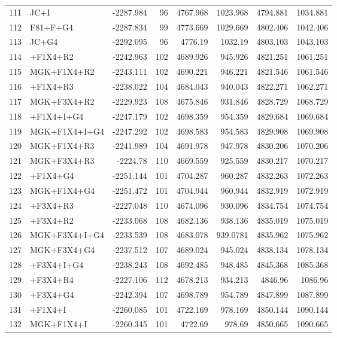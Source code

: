 \documentclass[12pt]{article}
\begin{document}
\begin{longtable}{clrrrrrr}
	111 & JC+I & -2287.984 & 96 & 4767.968 & 1023.968 & 4794.881 & 1034.881 \\ 
	112 & F81+F+G4 & -2287.834 & 99 & 4773.669 & 1029.669 & 4802.406 & 1042.406 \\ 
	113 & JC+G4 & -2292.095 & 96 & 4776.19 & 1032.19 & 4803.103 & 1043.103 \\ 
	114 & \gy+F1X4+R2 & -2242.963 & 102 & 4689.926 & 945.926 & 4821.251 & 1061.251 \\ 
	115 & MGK+F1X4+R2 & -2243.111 & 102 & 4690.221 & 946.221 & 4821.546 & 1061.546 \\ 
	116 & \gy+F1X4+R3 & -2238.022 & 104 & 4684.043 & 940.043 & 4822.271 & 1062.271 \\ 
	117 & MGK+F3X4+R2 & -2229.923 & 108 & 4675.846 & 931.846 & 4828.729 & 1068.729 \\ 
	118 & \gy+F1X4+I+G4 & -2247.179 & 102 & 4698.359 & 954.359 & 4829.684 & 1069.684 \\ 
	119 & MGK+F1X4+I+G4 & -2247.292 & 102 & 4698.583 & 954.583 & 4829.908 & 1069.908 \\ 
	120 & MGK+F1X4+R3 & -2241.989 & 104 & 4691.978 & 947.978 & 4830.206 & 1070.206 \\ 
	121 & MGK+F3X4+R3 & -2224.78 & 110 & 4669.559 & 925.559 & 4830.217 & 1070.217 \\ 
	122 & \gy+F1X4+G4 & -2251.144 & 101 & 4704.287 & 960.287 & 4832.263 & 1072.263 \\ 
	123 & MGK+F1X4+G4 & -2251.472 & 101 & 4704.944 & 960.944 & 4832.919 & 1072.919 \\ 
	124 & \gy+F3X4+R3 & -2227.048 & 110 & 4674.096 & 930.096 & 4834.754 & 1074.754 \\ 
	125 & \gy+F3X4+R2 & -2233.068 & 108 & 4682.136 & 938.136 & 4835.019 & 1075.019 \\ 
	126 & MGK+F3X4+I+G4 & -2233.539 & 108 & 4683.078 & 939.0781 & 4835.962 & 1075.962 \\ 
	127 & MGK+F3X4+G4 & -2237.512 & 107 & 4689.024 & 945.024 & 4838.134 & 1078.134 \\ 
	128 & \gy+F3X4+I+G4 & -2238.243 & 108 & 4692.485 & 948.485 & 4845.368 & 1085.368 \\ 
	129 & \gy+F3X4+R4 & -2227.106 & 112 & 4678.213 & 934.213 & 4846.96 & 1086.96 \\ 
	130 & \gy+F3X4+G4 & -2242.394 & 107 & 4698.789 & 954.789 & 4847.899 & 1087.899 \\ 
	131 & \gy+F1X4+I & -2260.085 & 101 & 4722.169 & 978.169 & 4850.144 & 1090.144 \\ 
	132 & MGK+F1X4+I & -2260.345 & 101 & 4722.69 & 978.69 & 4850.665 & 1090.665 \\ 

\end{longtable}
\end{document}
